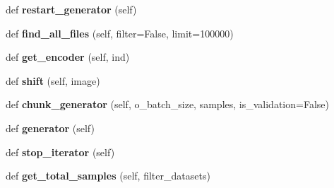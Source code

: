 \begin{DoxyCompactItemize}
\mbox{\label{classgenerator_1_1SuperGeneratorV2_a49fe67685bc8ea310c290a361f6d540b}} 
def {\bfseries restart\+\_\+generator} (self)
\item 
\mbox{\label{classgenerator_1_1SuperGeneratorV2_a09d0823e76b29d89bc2bcf63b0876877}} 
def {\bfseries find\+\_\+all\+\_\+files} (self, filter=False, limit=100000)
\item 
\mbox{\label{classgenerator_1_1SuperGeneratorV2_a44bab6fa3fc58a9951539e3bcbdc7498}} 
def {\bfseries get\+\_\+encoder} (self, ind)
\item 
\mbox{\label{classgenerator_1_1SuperGeneratorV2_a5abd0d59b2c49f4537b50caaf719842d}} 
def {\bfseries shift} (self, image)
\item 
\mbox{\label{classgenerator_1_1SuperGeneratorV2_ac1f304f16e5916a0ae1b3527779e6a5f}} 
def {\bfseries chunk\+\_\+generator} (self, o\+\_\+batch\+\_\+size, samples, is\+\_\+validation=False)
\item 
\mbox{\label{classgenerator_1_1SuperGeneratorV2_a4c88d298faea5ad1fbf8a8c2b2e89d5a}} 
def {\bfseries generator} (self)
\item 
\mbox{\label{classgenerator_1_1SuperGeneratorV2_ab6bccdba4309322234a357f8e463d403}} 
def {\bfseries stop\+\_\+iterator} (self)
\item 
\mbox{\label{classgenerator_1_1SuperGeneratorV2_ad453a4acf35c1c745822f3224a369919}} 
def {\bfseries get\+\_\+total\+\_\+samples} (self, filter\+\_\+datasets)
\end{DoxyCompactItemize}
